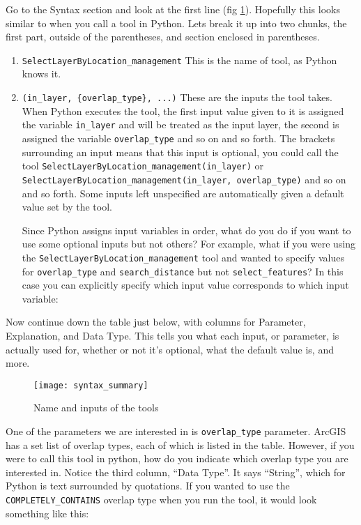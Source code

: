 \documentclass{article}
\begin{document}
Go to the Syntax section and look at the first line (fig \ref{fig:syntax}).  Hopefully this looks similar to when you call a tool in Python.  Lets break it up into two chunks, the first part, outside of the parentheses, and section enclosed in parentheses.
\begin{enumerate}
    \item \texttt{SelectLayerByLocation\_management} This is the name of tool, as Python knows it. 
    \item \texttt{(in\_layer, \{overlap\_type\}, ...)} These are the inputs the tool takes.  When Python executes the tool, the first input value given to it is assigned the variable \texttt{in\_layer} and will be treated as the input layer, the second is assigned the variable \texttt{overlap\_type} and so on and so forth.  The brackets surrounding an input means that this input is optional, you could call the tool \texttt{SelectLayerByLocation\_management(in\_layer)} or \texttt{SelectLayerByLocation\_management(in\_layer, overlap\_type)} 
        and so on and so forth.  Some inputs left unspecified are automatically given a default value set by the tool.

    Since Python assigns input variables in order, what do you do if you want to use some optional inputs but not others?  For example, what if you were using the \texttt{SelectLayerByLocation\_management} tool and wanted to specify values for \texttt{overlap\_type} and \texttt{search\_distance} but not \texttt{select\_features}?  In this case you can explicitly specify which input value corresponds to which input variable: 
\end{enumerate}

Now continue down the table just below, with columns for Parameter, Explanation, and Data Type.  This tells you what each input, or parameter,  is actually used for, whether or not it's optional, what the default value is, and more.

\begin{figure}
    \texttt{[image: syntax\_summary]}
    \caption{Name and inputs of the tools}
    \label{fig:syntax}
\end{figure}

One of the parameters we are interested in is \texttt{overlap\_type} parameter.  ArcGIS has a set list of overlap types, each of which is listed in the table.  However, if you were to call this tool in python, how do you indicate which overlap type you are interested in.  Notice the third column, ``Data Type''.  It says ``String'', which for Python is text surrounded by quotations.  If you wanted to use the \texttt{COMPLETELY\_CONTAINS} overlap type when you run the tool, it would look something like this: 
\end{document}

